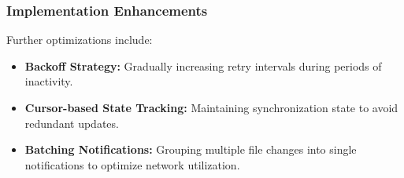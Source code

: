 \subsubsection{Implementation Enhancements}
Further optimizations include:
\begin{itemize}
    \item \textbf{Backoff Strategy:} Gradually increasing retry intervals during periods of inactivity.
    \item \textbf{Cursor-based State Tracking:} Maintaining synchronization state to avoid redundant updates.
    \item \textbf{Batching Notifications:} Grouping multiple file changes into single notifications to optimize network utilization.
\end{itemize}

